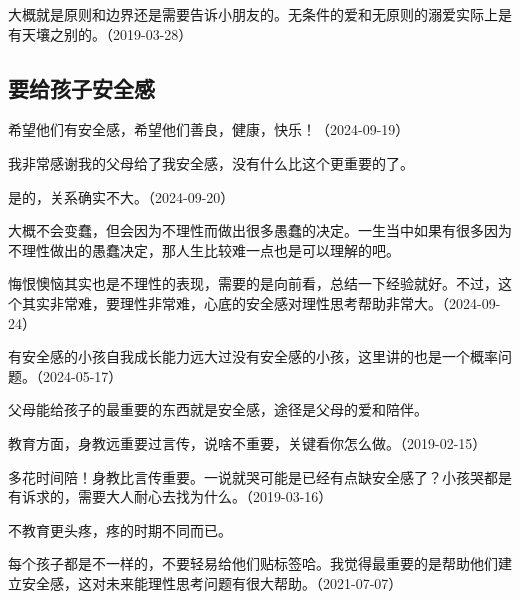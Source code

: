 大概就是原则和边界还是需要告诉小朋友的。无条件的爱和无原则的溺爱实际上是有天壤之别的。（2019-03-28）

\subsection{要给孩子安全感}


希望他们有安全感，希望他们善良，健康，快乐！（2024-09-19）

我非常感谢我的父母给了我安全感，没有什么比这个更重要的了。


是的，关系确实不大。（2024-09-20）


大概不会变蠢，但会因为不理性而做出很多愚蠢的决定。一生当中如果有很多因为不理性做出的愚蠢决定，那人生比较难一点也是可以理解的吧。


悔恨懊恼其实也是不理性的表现，需要的是向前看，总结一下经验就好。不过，这个其实非常难，要理性非常难，心底的安全感对理性思考帮助非常大。（2024-09-24）

有安全感的小孩自我成长能力远大过没有安全感的小孩，这里讲的也是一个概率问题。（2024-05-17）

父母能给孩子的最重要的东西就是安全感，途径是父母的爱和陪伴。

教育方面，身教远重要过言传，说啥不重要，关键看你怎么做。（2019-02-15）


多花时间陪！身教比言传重要。一说就哭可能是已经有点缺安全感了？小孩哭都是有诉求的，需要大人耐心去找为什么。（2019-03-16）


不教育更头疼，疼的时期不同而已。

每个孩子都是不一样的，不要轻易给他们贴标签哈。我觉得最重要的是帮助他们建立安全感，这对未来能理性思考问题有很大帮助。（2021-07-07）


